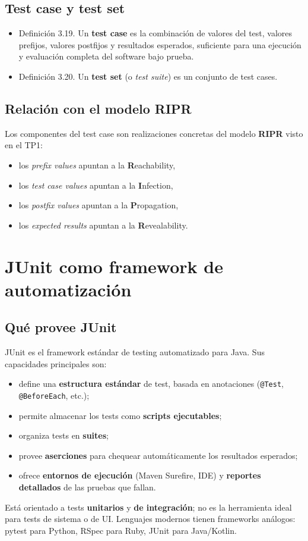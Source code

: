\documentclass[12pt,a4paper]{article}
\begin{document}
\subsection{Test case y test set}
\begin{itemize}
  \item Definición 3.19. Un \textbf{test case} es la combinación de valores del test, valores prefijos, valores postfijos y resultados esperados, suficiente para una ejecución y evaluación completa del software bajo prueba.
  \item Definición 3.20. Un \textbf{test set} (o \textit{test suite}) es un conjunto de test cases.
\end{itemize}

\subsection{Relación con el modelo RIPR}
Los componentes del test case son realizaciones concretas del modelo \textbf{RIPR} visto en el TP1:
\begin{itemize}
  \item los \textit{prefix values} apuntan a la \textbf{R}eachability,
  \item los \textit{test case values} apuntan a la \textbf{I}nfection,
  \item los \textit{postfix values} apuntan a la \textbf{P}ropagation,
  \item los \textit{expected results} apuntan a la \textbf{R}evealability.
\end{itemize}

\section{JUnit como framework de automatización}

\subsection{Qué provee JUnit}
JUnit es el framework estándar de testing automatizado para Java. Sus capacidades principales son:
\begin{itemize}
  \item define una \textbf{estructura estándar} de test, basada en anotaciones (\texttt{@Test}, \texttt{@BeforeEach}, etc.);
  \item permite almacenar los tests como \textbf{scripts ejecutables};
  \item organiza tests en \textbf{suites};
  \item provee \textbf{aserciones} para chequear automáticamente los resultados esperados;
  \item ofrece \textbf{entornos de ejecución} (Maven Surefire, IDE) y \textbf{reportes detallados} de las pruebas que fallan.
\end{itemize}
Está orientado a tests \textbf{unitarios} y \textbf{de integración}; no es la herramienta ideal para tests de sistema o de UI. Lenguajes modernos tienen frameworks análogos: pytest para Python, RSpec para Ruby, JUnit para Java/Kotlin.
\end{document}

